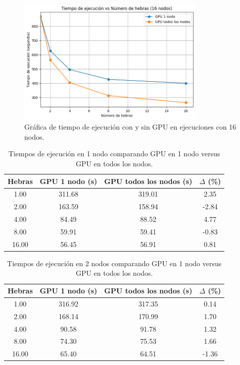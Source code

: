 \begin{figure}[ht]
    \centering
    \includegraphics[width=0.8\textwidth]{imagenes/cap5/exploratory_gpu_16nodes.png}
    \caption{Gráfica de tiempo de ejecución con y sin GPU en ejecuciones con 16 nodos.}
    \label{fig:exploratory_gpu_16nodes}
\end{figure}

\begin{table}[ht]
    \centering
    \begin{tabular}{c|ccc}
        Hebras & GPU 1 nodo (s) & GPU todos los nodos (s) & $\Delta$ (\%) \\
        \hline
        1.00   & 311.68         & 319.01                  & 2.35          \\
        2.00   & 163.59         & 158.94                  & -2.84         \\
        4.00   & 84.49          & 88.52                   & 4.77          \\
        8.00   & 59.91          & 59.41                   & -0.83         \\
        16.00  & 56.45          & 56.91                   & 0.81          \\
    \end{tabular}
    \caption{Tiempos de ejecución en 1 nodo comparando GPU en 1 nodo versus GPU en todos los nodos.}
    \label{tab:gpu_1node}
\end{table}

\begin{table}[ht]
    \centering
    \begin{tabular}{c|ccc}
        Hebras & GPU 1 nodo (s) & GPU todos los nodos (s) & $\Delta$ (\%) \\
        \hline
        1.00   & 316.92         & 317.35                  & 0.14          \\
        2.00   & 168.14         & 170.99                  & 1.70          \\
        4.00   & 90.58          & 91.78                   & 1.32          \\
        8.00   & 74.30          & 75.53                   & 1.66          \\
        16.00  & 65.40          & 64.51                   & -1.36         \\
    \end{tabular}
    \caption{Tiempos de ejecución en 2 nodos comparando GPU en 1 nodo versus GPU en todos los nodos.}
    \label{tab:gpu_2nodes}
\end{table}

